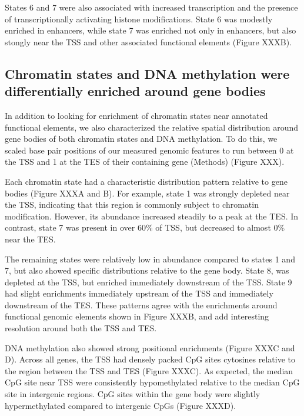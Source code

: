 \documentclass[10pt,letterpaper]{article}
\begin{document}
States 6 and 7 were also associated with increased transcription and the
presence of transcriptionally activating histone modifications. State 6
was modestly enriched in enhancers, while state 7 was enriched not only
in enhancers, but also stongly near the TSS and other associated
functional elements (Figure XXXB).

\hypertarget{chromatin-states-and-dna-methylation-were-differentially-enriched-around-gene-bodies}{%
\subsection{Chromatin states and DNA methylation were differentially
enriched around gene
bodies}\label{chromatin-states-and-dna-methylation-were-differentially-enriched-around-gene-bodies}}

In addition to looking for enrichment of chromatin states near annotated
functional elements, we also characterized the relative spatial
distribution around gene bodies of both chromatin states and DNA
methylation. To do this, we scaled base pair positions of our measured
genomic features to run between 0 at the TSS and 1 at the TES of their
containing gene (Methods) (Figure XXX).

Each chromatin state had a characteristic distribution pattern relative
to gene bodies (Figure XXXA and B). For example, state 1 was strongly
depleted near the TSS, indicating that this region is commonly subject
to chromatin modification. However, its abundance increased steadily to
a peak at the TES. In contrast, state 7 was present in over 60\% of TSS,
but decreased to almost 0\% near the TES.

The remaining states were relatively low in abundance compared to states
1 and 7, but also showed specific distributions relative to the gene
body. State 8, was depleted at the TSS, but enriched immediately
downstream of the TSS. State 9 had slight enrichments immediately
upstream of the TSS and immediately downstream of the TES. These
patterns agree with the enrichments around functional genomic elements
shown in Figure XXXB, and add interesting resolution around both the TSS
and TES.

DNA methylation also showed strong positional enrichments (Figure XXXC
and D). Across all genes, the TSS had densely packed CpG sites cytosines
relative to the region between the TSS and TES (Figure XXXC). As
expected, the median CpG site near TSS were consistently hypomethylated
relative to the median CpG site in intergenic regions. CpG sites within
the gene body were slightly hypermethylated compared to intergenic CpGs
(Figure XXXD).
\end{document}
